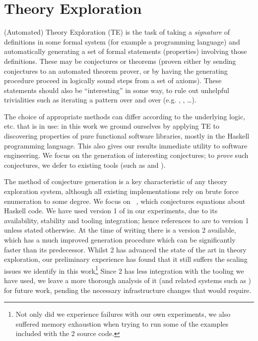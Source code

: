 \section{Theory Exploration}
\label{sec:theoryexploration}

(Automated) Theory Exploration (TE) is the task of taking a \emph{signature}
of definitions \iffalse TODO: Alison Some tools generate their own definitions
\fi in some formal system (for example a programming language) and
automatically generating a set of formal statements (properties) involving
those definitions. These may be conjectures or theorems (proven either by
sending conjectures to an automated theorem prover, or by having the generating
procedure proceed in logically sound steps from a set of axioms). These
statements should also be
``interesting'' in some way, to rule out unhelpful trivialities such as
iterating a pattern over and over (e.g. , ,
\dots).

\iffalse
It is beyond the scope of this paper
to define what makes a mathematical statement ``interesting'', but this problem
has been tackled extensively in the literature~\cite{colton2000notion}.
\fi

The choice of appropriate methods can differ according to the underlying logic,
etc. that is in use: in this work we ground ourselves by applying TE to
discovering properties of pure functional software libraries, mostly in the
Haskell programming language. This also gives our results immediate utility to
software engineering. We focus on the generation of interesting conjectures; to
\emph{prove} such conjectures, we defer to existing tools (such as \hip{} and
\hipspec{}).

The method of conjecture generation is a key characteristic of any theory
exploration system, although all existing implementations rely on brute force
enumeration to some degree. We focus on \quickspec{}~\cite{QuickSpec}, which
conjectures equations about Haskell code. We have used version 1 of \quickspec{}
in our experiments, due to its availability, stability and tooling integration;
hence references to \quickspec{} are to version 1 unless stated otherwise. At
the time of writing \iffalse TODO: Alison: Include date \fi there is a
\quickspec{} version 2 available, which has a much improved generation procedure
which can be significantly faster than its predecessor. Whilst \quickspec{} 2
has advanced the state of the art in theory exploration, our preliminary
experience has found that it still suffers the scaling issues we identify in
this work\footnote{Not only did we experience failures with our own experiments,
  we also suffered memory exhaustion when trying to run some of the examples
  included with the \quickspec{} 2 source code.} Since \quickspec{} 2 has less
integration with the tooling we have used, we leave a more thorough analysis of
it (and related systems such as \speculate{}) for future work, pending the
necessary infrastructure changes that would require.


